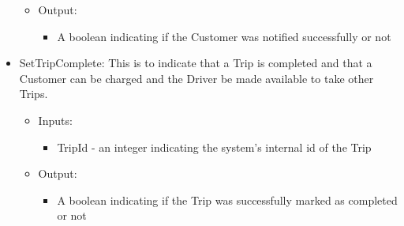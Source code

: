 \documentclass[10pt, onecolumn]{witseiepaper}
\begin{document}
\begin{itemize}
\begin{itemize}
\begin{itemize}
		\end{itemize}
	\item Output:
		\begin{itemize}
		\item A boolean indicating if the Customer was notified successfully or not
		\end{itemize}
	\end{itemize}
\item SetTripComplete: This is to indicate that a Trip is completed and that a Customer can be charged and the Driver be made available to take other Trips.
	\begin{itemize}
	\item Inputs:
		\begin{itemize}
		\item TripId - an integer indicating the system's internal id of the Trip
		\end{itemize}
	\item Output:
		\begin{itemize}
		\item A boolean indicating if the Trip was successfully marked as completed or not
		\end{itemize}
	\end{itemize}
\end{itemize}
\end{document}
